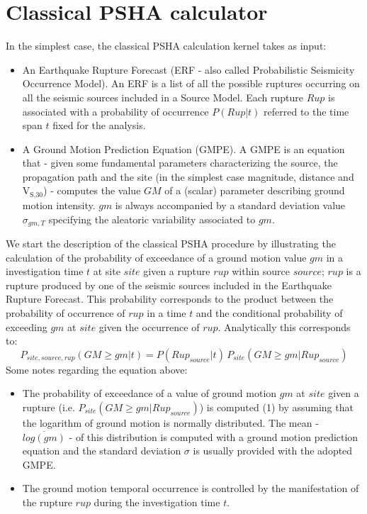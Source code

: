 %
\section{Classical PSHA calculator}
\label{chap:classic_psha}
%
In the simplest case, the classical PSHA calculation kernel takes as input: 
%
\begin{itemize}
%
\item An Earthquake Rupture Forecast (ERF - also called Probabilistic Seismicity Occurrence Model). An ERF is a list of all the possible ruptures occurring on all the seismic sources included in a Source Model. Each rupture $Rup$ is associated with a probability of occurrence $P(Rup|t)$ referred to the time span $t$ fixed for the analysis. 
%
\item A Ground Motion Prediction Equation (GMPE). A GMPE is an equation that - given some fundamental parameters characterizing the source, the propagation
path and the site (in the simplest case magnitude, distance and V$_\text{S,30}$) - computes the value $GM$ of a (scalar) parameter describing ground motion intensity. $gm$ is always accompanied by a standard deviation value $\sigma_{gm,T}$ specifying the aleatoric variability associated to $gm$.
\end{itemize}

We start the description of the classical PSHA procedure by illustrating the calculation of the probability of exceedance of a ground motion value $gm$ in a investigation time $t$ at site $site$ given a rupture $rup$ within source $source$; $rup$ is a rupture produced by one of the seismic sources included in the Earthquake Rupture Forecast. 
%
This probability corresponds to the product between the probability of occurrence of $rup$ in a time $t$ and the conditional probability of exceeding $gm$ at $site$ given the occurrence of $rup$. Analytically this corresponds to:
\begin{equation}
P_{site,source,rup}(GM \geq gm|t) = P(Rup_{source}|t)\,P_{site}(GM\geq gm|Rup_{source})
\label{eq:prob_gm_ex_one_rup}
\end{equation}
%
Some notes regarding the equation above:
\begin{itemize}
\item The probability of exceedance of a value of ground motion $gm$ at $site$ given a rupture (i.e. $P_{site}(GM\geq gm|Rup_{source})$) is computed (1) by assuming that the logarithm of ground motion is normally distributed. The mean - $\overline{log(gm)}$ - of this distribution is computed with a ground motion prediction equation and the standard deviation $\sigma$ is usually provided with the adopted GMPE.
\item The ground motion temporal occurrence is controlled by the manifestation of the rupture $rup$ during the investigation time $t$.  
\end{itemize}

